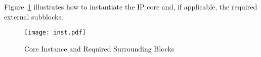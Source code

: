 %

Figure~\ref{fig:inst} illustrates how to instantiate the IP core and, if applicable, the
required external subblocks.

\begin{figure}[!htbp]
    \centerline{\texttt{[image: inst.pdf]}}
    \vspace{0cm}\caption{Core Instance and Required Surrounding Blocks}
    \label{fig:inst}
\end{figure}



